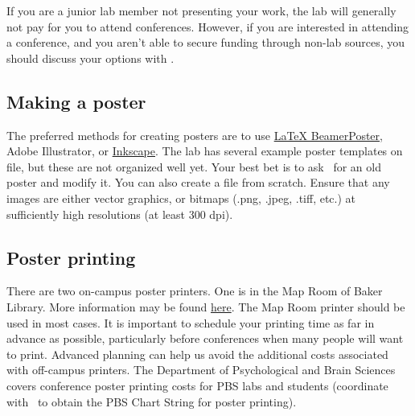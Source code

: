 \documentclass{tufte-book} %
\begin{document}
 If you are a junior lab member not presenting your work, the lab will
 generally not pay for you to attend conferences.  However, if you are
 interested in attending a conference, and you aren't able to secure
 funding through non-lab sources, you should discuss your options with
 \director.

 \subsection{Making a poster}
  The preferred methods for creating posters are to use
 \href{https://github.com/deselaers/latex-beamerposter}{LaTeX
   BeamerPoster}, Adobe Illustrator, or
 \href{https://inkscape.org/en/}{Inkscape}.  The lab has several
 example poster templates on file, but these are not organized well
 yet.  Your best bet is to ask \director~for an old poster and modify
 it.  You can also create a file from scratch.  Ensure that any images
 are either vector graphics, or bitmaps (.png, .jpeg, .tiff, etc.) at
 sufficiently high resolutions (at least 300 dpi).


 \subsection{Poster printing}
   There are two
 on-campus poster printers.  One is in the Map Room of Baker Library.
 More information may be found
 \href{http://www.dartmouth.edu/~library/maproom/printingfaq.html}{here}.
 The Map Room printer should be used in most cases.  It is important
 to schedule your printing time as far in advance as possible,
 particularly before conferences when many people will want to print.
 Advanced planning can help us avoid the additional costs associated
 with off-campus printers.  The Department of Psychological and Brain
 Sciences covers conference poster printing costs for PBS labs and
 students (coordinate with \coordinator~to obtain the PBS Chart String
 for poster printing).
\end{document}
